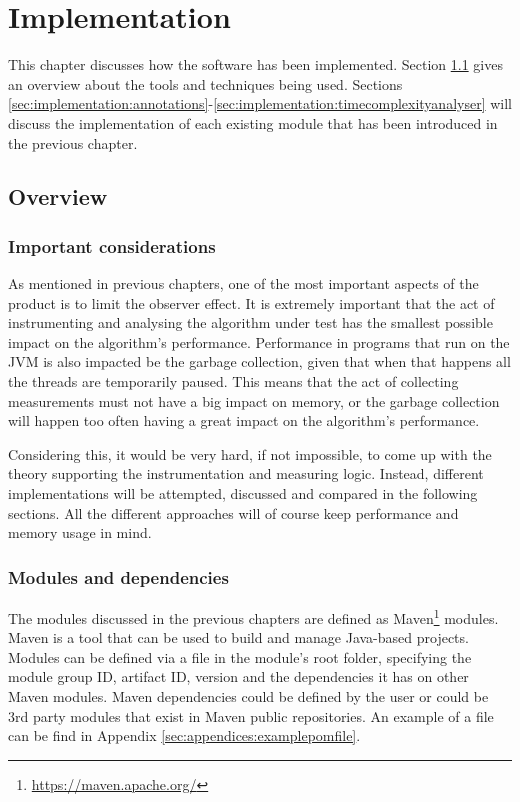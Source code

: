 \chapter{Implementation}

This chapter discusses how the software has been implemented. Section \ref{sec:implementation:overview} gives an overview about the tools and techniques being used. Sections \ref{sec:implementation:annotations}-\ref{sec:implementation:timecomplexityanalyser} will discuss the implementation of each existing module that has been introduced in the previous chapter.

\section{Overview}
\label{sec:implementation:overview}

\subsection{Important considerations}
As mentioned in previous chapters, one of the most important aspects of the product is to limit the observer effect. It is extremely important that the act of instrumenting and analysing the algorithm under test has the smallest possible impact on the algorithm's performance. Performance in programs that run on the JVM is also impacted be the garbage collection, given that when that happens all the threads are temporarily paused. This means that the act of collecting measurements must not have a big impact on memory, or the garbage collection will happen too often having a great impact on the algorithm's performance.

\noindent Considering this, it would be very hard, if not impossible, to come up with the theory supporting the instrumentation and measuring logic. Instead, different implementations will be attempted, discussed and compared in the following sections. All the different approaches will of course keep performance and memory usage in mind.

\subsection{Modules and dependencies}
The modules discussed in the previous chapters are defined as Maven\footnote{\url{https://maven.apache.org/}} modules. Maven is a tool that can be used to build and manage Java-based projects. Modules can be defined via a  file in the module's root folder, specifying the module group ID, artifact ID, version and the dependencies it has on other Maven modules. Maven dependencies could be defined by the user or could be 3rd party modules that exist in Maven public repositories. An example of a  file can be find in Appendix \ref{sec:appendices:examplepomfile}.

